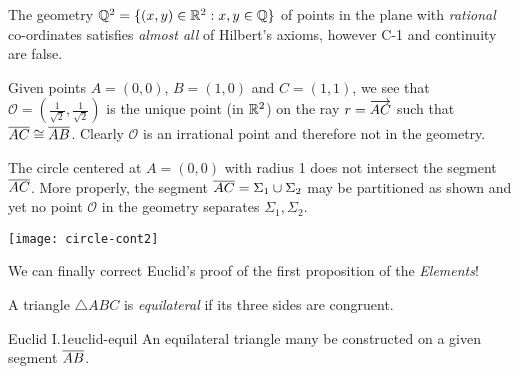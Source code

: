 \begin{example}{}{}
The geometry $\mathbb{Q}^2=\{(x,y)\in\mathbb{R}^2:x,y\in\mathbb{Q}\}$ of points in the plane with \emph{rational} co-ordinates satisfies \emph{almost all} of Hilbert's axioms, however C-1 and continuity are false.\par
\begin{minipage}[t]{0.7\linewidth}\vspace{-5pt}
\begin{description}\itemsep0pt
	\item[\normalfont\emph{Axiom C-1}] Given points $A=(0,0)$, $B=(1,0)$ and $C=(1,1)$, we see that $\mathcal O=(\frac 1{\sqrt 2},\frac 1{\sqrt 2})$ is the unique point (in $\mathbb{R}^2$) on the ray $r=\overrightarrow{AC}$ such that $\overline{AC}\cong\overline{AB}$. Clearly $\mathcal O$ is an irrational point and therefore not in the geometry.
	\item[\normalfont\emph{Continuity}] The circle centered at $A=(0,0)$ with radius 1 does not intersect the segment $\overline{AC}$. More properly, the segment $\overline{AC}=\Sigma_1\cup\Sigma_2$ may be partitioned as shown and yet no point $\mathcal O$ in the geometry separates $\Sigma_1,\Sigma_2$.
\end{description}
\end{minipage}\hfill\begin{minipage}[t]{0.29\linewidth}\vspace{0pt}
\flushright \texttt{[image: circle-cont2]}
\end{minipage}
\end{example}

\goodbreak


We can finally correct Euclid's proof of the first proposition of the \emph{Elements}!

\begin{defn}{}{}
A triangle $\triangle ABC$ is \emph{equilateral} if its three sides are congruent.
\end{defn}

\begin{thm}{Euclid I.1}{euclid-equil}
An equilateral triangle many be constructed on a given segment $\overline{AB}$.
\end{thm}

